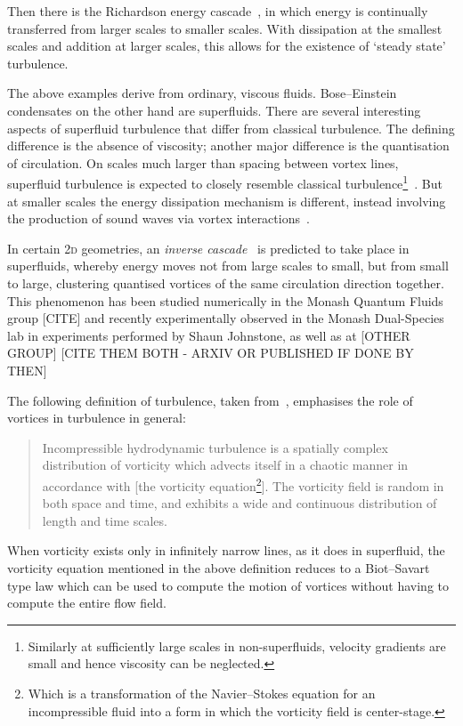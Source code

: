 Then there is the Richardson energy cascade~\cite{richardson_weather_2007}, in which energy is continually transferred from larger scales to smaller scales. With dissipation at the smallest scales and addition at larger scales, this allows for the existence of `steady state' turbulence.

The above examples derive from ordinary, viscous fluids. Bose--Einstein condensates on the other hand are superfluids. There are several interesting aspects of superfluid turbulence that differ from classical turbulence. The defining difference is the absence of viscosity; another major difference is the quantisation of circulation. On scales much larger than spacing between vortex lines, superfluid turbulence is expected to closely resemble classical turbulence\footnote{Similarly at sufficiently large scales in non-superfluids, velocity gradients are small and hence viscosity can be neglected.}~\cite{tsubota_energy_2009}. But at smaller scales the energy dissipation mechanism is different, instead involving the production of sound waves via vortex interactions~\cite{tsubota_energy_2009, vinen_how_2005}.

In certain 2\textsc{d} geometries, an \emph{inverse cascade}~\cite{onsager_statistical_1949, kraichnan_inertial_1967} is predicted to take place in superfluids, whereby energy moves not from large scales to small, but from small to large, clustering quantised vortices of the same circulation direction together. This phenomenon has been studied numerically in the Monash Quantum Fluids group [CITE] and recently experimentally observed in the Monash Dual-Species lab in experiments performed by Shaun Johnstone, as well as at [OTHER GROUP] [CITE THEM BOTH - ARXIV OR PUBLISHED IF DONE BY THEN]

The following definition of turbulence, taken from~\cite[p 53]{davidson_turbulence:_2004}, emphasises the role of vortices in turbulence in general:
\begin{quote}
Incompressible hydrodynamic turbulence is a spatially complex distribution of vorticity which advects itself in a chaotic manner in accordance with [the vorticity equation\footnote{Which is a transformation of the Navier--Stokes equation for an incompressible fluid into a form in which the vorticity field is center-stage.}]. The vorticity field is random in both space and time, and exhibits a wide and continuous distribution of length and time scales.
\end{quote}

When vorticity exists only in infinitely narrow lines, as it does in superfluid, the vorticity equation mentioned in the above definition reduces to a Biot--Savart type law which can be used to compute the motion of vortices without having to compute the entire flow field.

